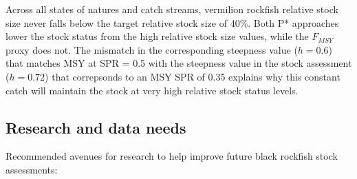 \documentclass[11pt,
  english,
  letterpaper,
]{article}
\begin{document}
Across all states of natures and catch streams, vermilion rockfish relative stock size never falls below the target relative stock size of 40\%. Both P* approaches lower the stock status from the high relative stock size values, while the \(F_{MSY}\) proxy does not. The mismatch in the corresponding steepness value (\(h=0.6\)) that matches MSY at SPR = 0.5 with the steepness value in the stock assessment (\(h=0.72\)) that correpsonds to an MSY SPR of 0.35 explains why this constant catch will maintain the stock at very high relative stock status levels.

\clearpage



\clearpage

\hypertarget{research-and-data-needs}{%
\subsection*{Research and data needs}\label{research-and-data-needs}}

Recommended avenues for research to help improve future black rockfish stock assessments:
\end{document}
